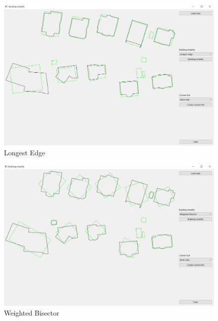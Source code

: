 \documentclass[11pt]{article}
\begin{document}
	\begin{figure}[htbh]
		\centering
		\includegraphics[scale=0.4]{images/U2_aplikace_LongestEdge.png} 
		\caption{Longest Edge}
		\label{fig:app_LongestEdge}
	\end{figure} \begin{figure}[htbh]
		\centering
		\includegraphics[scale=0.4]{images/U2_aplikace_WeightedBisector.png} 
		\caption{Weighted Bisector}
		\label{fig:app_WeightedBisector}
	\end{figure} 
	
	\clearpage
	
\end{document}
